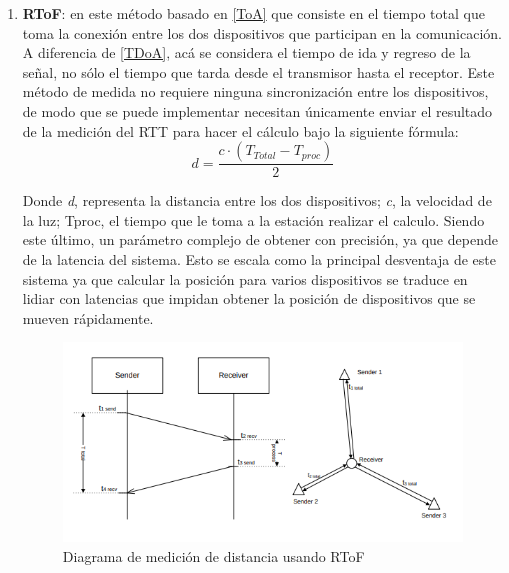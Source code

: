 \begin{itemize}
{\begin{enumerate}
{        }
        \newpage 
        \item {\textbf{\ac{RToF}}: en este método basado en \ref{ToA} que consiste en el tiempo total que toma la conexión entre los dos dispositivos que participan en la comunicación. A diferencia de \ref{TDoA}, acá se considera el tiempo de ida y regreso de la señal, no sólo el tiempo que tarda desde el transmisor hasta el receptor. Este método de medida no requiere ninguna sincronización entre los dispositivos, de modo que se puede implementar necesitan únicamente enviar el resultado de la medición del \ac{RTT} para hacer el cálculo bajo la siguiente fórmula:\\
        
        \begin{equation}
            d = \dfrac{c\cdot{\left(T_{Total} - T_{proc}\right)}}{2}
        \end{equation}
        
        Donde \textit{d}, representa la distancia entre los dos dispositivos; \textit{c}, la velocidad de la luz; Tproc, el tiempo que le toma a la estación realizar el calculo. Siendo este último, un parámetro complejo de obtener con precisión, ya que depende de la latencia del sistema. Esto se escala como la principal desventaja de este sistema ya que calcular la posición para varios dispositivos se traduce en lidiar con latencias que impidan obtener la posición de dispositivos que se mueven rápidamente.\\
        
        \begin{figure}[h!]
            \centering
            \includegraphics[scale=0.52]{Tesis/images/rtof}
            \caption{Diagrama de medición de distancia usando \ac{RToF}}
            \label{fig:RTOF}
        \end{figure}
        }
    \end{enumerate}
            }


\end{itemize}
